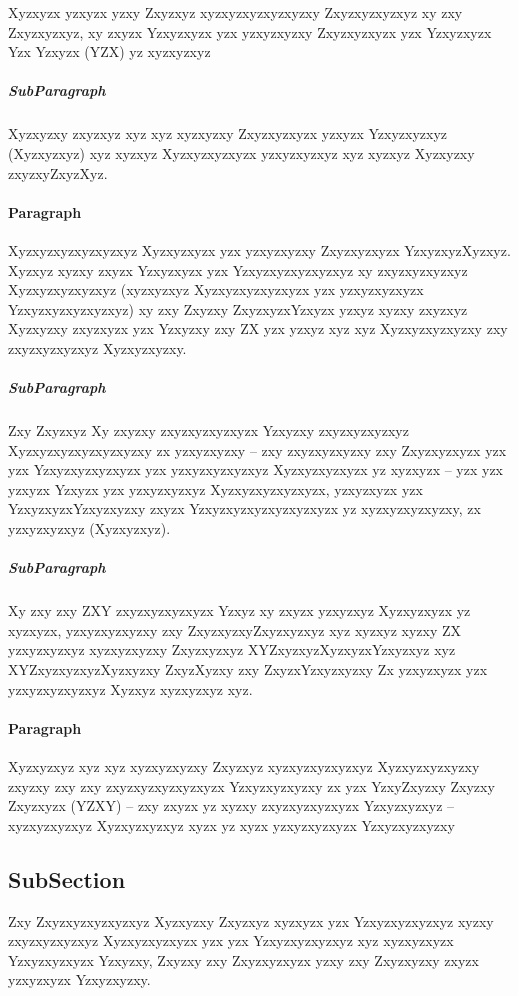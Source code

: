 Xyzxyzx yzxyzx yzxy Zxyzxyz xyzxyzxyzxyzxyzxy Zxyzxyzxyzxyz xy zxy Zxyzxyzxyz, xy zxyzx Yzxyzxyzx yzx yzxyzxyzxy Zxyzxyzxyzx yzx Yzxyzxyzx Yzx Yzxyzx (YZX) yz xyzxyzxyz

\subparagraph{SubParagraph} Xyzxyzxy zxyzxyz xyz xyz xyzxyzxy Zxyzxyzxyzx yzxyzx Yzxyzxyzxyz (Xyzxyzxyz) xyz xyzxyz Xyzxyzxyzxyzx yzxyzxyzxyz xyz xyzxyz Xyzxyzxy zxyzxyZxyzXyz.

\paragraph{Paragraph} Xyzxyzxyzxyzxyzxyz Xyzxyzxyzx yzx yzxyzxyzxy Zxyzxyzxyzx YzxyzxyzXyzxyz. Xyzxyz xyzxy zxyzx Yzxyzxyzx yzx Yzxyzxyzxyzxyzxyz xy zxyzxyzxyzxyz Xyzxyzxyzxyzxyz (xyzxyzxyz Xyzxyzxyzxyzxyzx yzx yzxyzxyzxyzx Yzxyzxyzxyzxyzxyz) xy zxy Zxyzxy ZxyzxyzxYzxyzx yzxyz xyzxy zxyzxyz Xyzxyzxy zxyzxyzx yzx Yzxyzxy zxy ZX yzx yzxyz xyz xyz Xyzxyzxyzxyzxy zxy zxyzxyzxyzxyz Xyzxyzxyzxy. 

\subparagraph{SubParagraph} Zxy Zxyzxyz Xy zxyzxy zxyzxyzxyzxyzx Yzxyzxy zxyzxyzxyzxyz Xyzxyzxyzxyzxyzxyzxy zx yzxyzxyzxy -- zxy zxyzxyzxyzxy zxy Zxyzxyzxyzx yzx yzx Yzxyzxyzxyzxyzx yzx yzxyzxyzxyzxyz Xyzxyzxyzxyzx yz xyzxyzx -- yzx yzx yzxyzx Yzxyzx yzx yzxyzxyzxyz Xyzxyzxyzxyzxyzx, yzxyzxyzx yzx YzxyzxyzxYzxyzxyzxy zxyzx Yzxyzxyzxyzxyzxyzxyzx yz xyzxyzxyzxyzxy, zx yzxyzxyzxyz (Xyzxyzxyz).

\subparagraph{SubParagraph} Xy zxy zxy ZXY zxyzxyzxyzxyzx Yzxyz xy zxyzx yzxyzxyz Xyzxyzxyzx yz xyzxyzx, yzxyzxyzxyzxy zxy ZxyzxyzxyZxyzxyzxyz xyz xyzxyz xyzxy ZX yzxyzxyzxyz xyzxyzxyzxy Zxyzxyzxyz XYZxyzxyzXyzxyzxYzxyzxyz xyz XYZxyzxyzxyzXyzxyzxy ZxyzXyzxy zxy ZxyzxYzxyzxyzxy Zx yzxyzxyzx yzx yzxyzxyzxyzxyz Xyzxyz xyzxyzxyz xyz.

\paragraph{Paragraph} Xyzxyzxyz xyz xyz xyzxyzxyzxy Zxyzxyz xyzxyzxyzxyzxyz Xyzxyzxyzxyzxy zxyzxy zxy zxy zxyzxyzxyzxyzxyzx Yzxyzxyzxyzxy zx yzx YzxyZxyzxy Zxyzxy Zxyzxyzx (YZXY) -- zxy zxyzx yz xyzxy zxyzxyzxyzxyzx Yzxyzxyzxyz -- xyzxyzxyzxyz Xyzxyzxyzxyz xyzx yz xyzx yzxyzxyzxyzx Yzxyzxyzxyzxy

\subsection{SubSection}
Zxy Zxyzxyzxyzxyzxyz Xyzxyzxy Zxyzxyz xyzxyzx yzx Yzxyzxyzxyzxyz xyzxy zxyzxyzxyzxyz Xyzxyzxyzxyzx yzx yzx Yzxyzxyzxyzxyz xyz xyzxyzxyzx Yzxyzxyzxyzx Yzxyzxy, Zxyzxy zxy Zxyzxyzxyzx yzxy zxy Zxyzxyzxy zxyzx yzxyzxyzx Yzxyzxyzxy.

